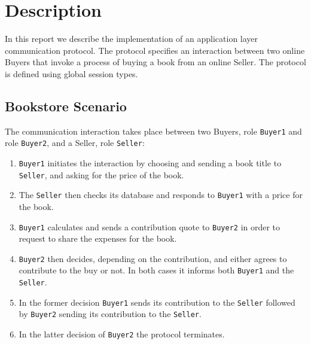 \newcommand{\BuyerOne}{\lstinline|Buyer1|\xspace}%
\newcommand{\BuyerTwo}{\lstinline|Buyer2|\xspace}%
\newcommand{\Seller}{\lstinline|Seller|\xspace}%

\section{Description}

In this report we describe the implementation of
an application layer communication protocol.
The protocol specifies an interaction between
two online Buyers that invoke a process of
buying a book from an online Seller.
The protocol is defined using global session types.

\subsection{Bookstore Scenario}
\label{subsec:description}

The communication interaction takes place between two Buyers,
role \BuyerOne and role \BuyerTwo, and a Seller,
role \Seller:
\begin{enumerate}
	\item
			\BuyerOne initiates the interaction
			by choosing and sending a book title to \Seller,
			and asking for the price of the book.

	\item
			The \Seller then checks its database and
			responds to \BuyerOne with a price for the book.

	\item
			\BuyerOne calculates and
			sends a contribution quote to
			\BuyerTwo in order to request to
			share the expenses for the book.

	\item
			\BuyerTwo then decides, depending on
			the contribution, and
			either agrees to contribute
			to the buy or not. In both
			cases it informs both \BuyerOne
			and the \Seller.

	\item
			In the former decision \BuyerOne
			sends its contribution to the \Seller
			followed by \BuyerTwo sending its
			contribution to the \Seller.

	\item
			In the latter decision of \BuyerTwo
			the protocol terminates.
\end{enumerate}
			

